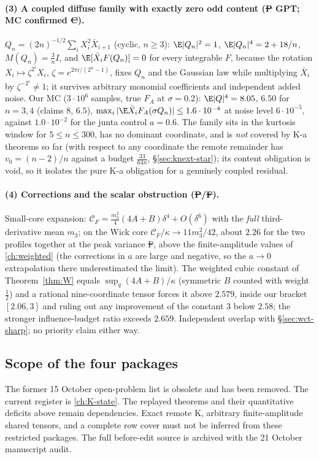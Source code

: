 \paragraph{(3) A coupled diffuse family with exactly zero odd content (\st{P} GPT; MC confirmed \st{C}).} $Q_n=(2n)^{-1/2}\sum_iX_i^2\bar X_{i+1}$ (cyclic, $n\ge3$): $\E|Q_n|^2=1$,
$\E|Q_n|^4=2+18/n$, $M(Q_n)=\frac3nI$, and $\E[\bar X_iF(Q_n)]=0$ for every integrable $F$, because the rotation $X_i\mapsto\zeta^{2^i}X_i$, $\zeta=e^{2\pi i/(2^n-1)}$, fixes $Q_n$ and the Gaussian law
while multiplying $\bar X_i$ by $\zeta^{-2^i}\ne1$; it survives arbitrary monomial coefficients and independent added noise. Our MC ($3\cdot10^6$ samples, true $F_A$ at $\sigma=0.2$): $\E|Q|^4=8.05$,
$6.50$ for $n=3,4$ (claims $8$, $6.5$), $\max_i|\E\bar X_iF_A(\sigma Q_n)|\le1.6\cdot10^{-4}$ at noise level $6\cdot10^{-5}$, against $1.0\cdot10^{-2}$ for the junta control $a=0.6$. The family sits in the
kurtosis window for $5\le n\le300$, has no dominant coordinate, and is \emph{not} covered by K-a theorems so far (with respect to any coordinate the remote remainder has $v_0=(n-2)/n$ against a
budget $\frac{33}{64n}$, \S\ref{sec:knext-star}); its content obligation is void, so it isolates the pure K-a obligation for a genuinely coupled residual.

\paragraph{(4) Corrections and the scalar obstruction (\st{P}/\st{F}).} Small-core expansion: $\mathcal C_F=\frac{m_3^2}4(4A+B)\delta^4+O(\delta^6)$ with the \emph{full} third-derivative mean $m_3$;
on the Wick core $\mathcal C_F/\kappa\to11m_3^2/42$, about $2.26$ for the two profiles together at the peak variance \st{F}, above the finite-amplitude values of \autoref{ch:weighted} (the corrections
in $a$ are large and negative, so the $a\to0$ extrapolation there underestimated the limit). The weighted cubic constant of Theorem~\ref{thm:W} equals $\sup_q(4A+B)/\kappa$ (symmetric $B$ counted
with weight $\frac12$) and a rational nine-coordinate tensor forces it above $2.579$, inside our bracket $[2.06,3]$ and ruling out any improvement of the constant $3$ below $2.58$; the stronger
influence-budget ratio exceeds $2.659$. Independent overlap with \S\ref{sec:wct-sharp}; no priority claim either way.

\subsection{Scope of the four packages}\label{sec:kfull-remains}
The former 15 October open-problem list is obsolete and has been removed.
The current register is \autoref{ch:K-state}. The replayed theorems and their
quantitative deficits above remain dependencies. Exact remote K, arbitrary
finite-amplitude shared tensors, and a complete row cover must not be
inferred from these restricted packages. The full before-edit source is
archived with the 21 October manuscript audit.

